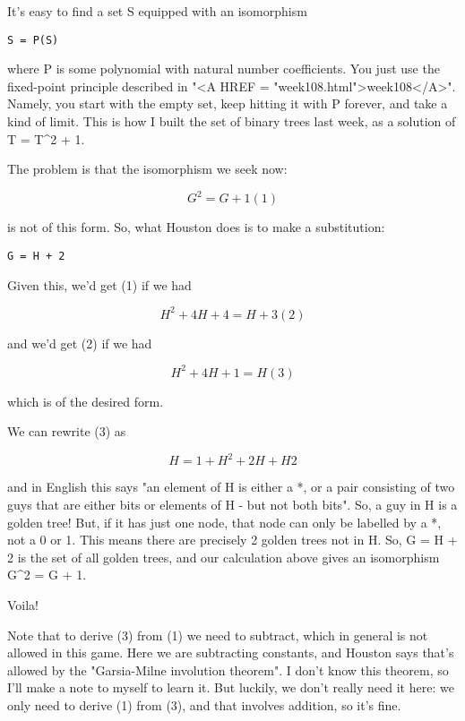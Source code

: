 It's easy to find a set S equipped with an isomorphism

\begin{verbatim}
S = P(S)
\end{verbatim}
    
where P is some polynomial with natural number coefficients.  You
just use the fixed-point principle described in "<A HREF = "week108.html">week108</A>".  Namely, 
you start with the empty set, keep hitting it with P forever, and take 
a kind of limit.  This is how I built the set of binary trees last week, 
as a solution of T = T^{2} + 1.   

The problem is that the isomorphism we seek now:

$$
G^{2} = G + 1                               (1)
$$
    
is not of this form.  So, what Houston does is to make a substitution:

\begin{verbatim}
G = H + 2
\end{verbatim}
    
Given this, we'd get (1) if we had

$$
H^{2} + 4H + 4 = H + 3                      (2)
$$
    
and we'd get (2) if we had

$$
H^{2} + 4H + 1 = H                          (3)
$$
    
which is of the desired form.  

We can rewrite (3) as

$$
H = 1 + H^{2} + 2H + H2
$$
    
and in English this says "an element of H is either a *, or
a pair consisting of two guys that are either bits or elements 
of H - but not both bits".  So, a guy in H is a golden tree! 
But, if it has just one node, that node can only be labelled
by a *, not a 0 or 1.  This means there are precisely 2 golden trees
not in H.  So, G = H + 2 is the set of all golden trees, and our
calculation above gives an isomorphism G^{2} = G + 1.

Voila!
             
Note that to derive (3) from (1) we need to subtract, which in general 
is not allowed in this game.  Here we are subtracting constants, and 
Houston says that's allowed by the "Garsia-Milne involution theorem".  
I don't know this theorem, so I'll make a note to myself to learn it.
But luckily, we don't really need it here: we only need to derive (1)
from (3), and that involves addition, so it's fine.

